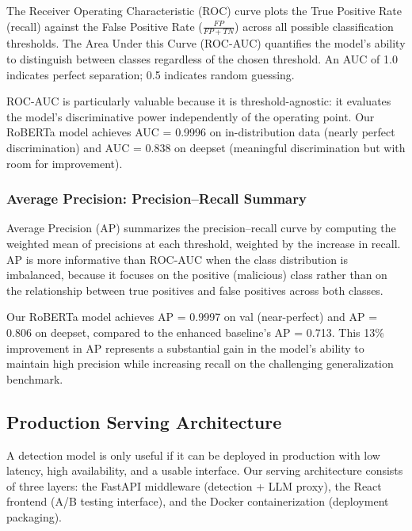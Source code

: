 \documentclass[12pt, letterpaper]{article}   %
\begin{document}
The Receiver Operating Characteristic (ROC) curve plots the True Positive Rate (recall) against the False Positive Rate ($\frac{FP}{FP + TN}$) across all possible classification thresholds. The Area Under this Curve (ROC-AUC) quantifies the model's ability to distinguish between classes regardless of the chosen threshold. An AUC of 1.0 indicates perfect separation; 0.5 indicates random guessing.

ROC-AUC is particularly valuable because it is threshold-agnostic: it evaluates the model's discriminative power independently of the operating point. Our RoBERTa model achieves AUC = 0.9996 on in-distribution data (nearly perfect discrimination) and AUC = 0.838 on deepset (meaningful discrimination but with room for improvement).

\subsubsection{Average Precision: Precision--Recall Summary}

Average Precision (AP) summarizes the precision--recall curve by computing the weighted mean of precisions at each threshold, weighted by the increase in recall. AP is more informative than ROC-AUC when the class distribution is imbalanced, because it focuses on the positive (malicious) class rather than on the relationship between true positives and false positives across both classes.

Our RoBERTa model achieves AP = 0.9997 on val (near-perfect) and AP = 0.806 on deepset, compared to the enhanced baseline's AP = 0.713. This 13\% improvement in AP represents a substantial gain in the model's ability to maintain high precision while increasing recall on the challenging generalization benchmark.


\subsection{Production Serving Architecture}

A detection model is only useful if it can be deployed in production with low latency, high availability, and a usable interface. Our serving architecture consists of three layers: the FastAPI middleware (detection + LLM proxy), the React frontend (A/B testing interface), and the Docker containerization (deployment packaging).
\end{document}
